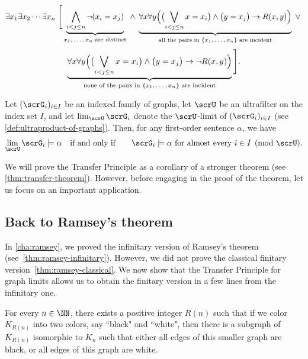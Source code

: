 \begin{examples}
\begin{enumerate}
    \[
      \exists x_1 \exists x_2 \cdots \exists x_n \;
      \Bigg[
        \underbrace{
          \bigwedge_{i < j \le n} \neg(x_i = x_j)
        }_{\text{$x_1,\dots, x_n$ are distinct}}
        \;\wedge\;
        \underbrace{
          \forall x \forall y \Bigl(
          \bigl( \bigvee_{i < j \le n} x = x_i \bigr)
          \wedge
          \bigl( y = x_j \bigr)
          \rightarrow R(x, y)
          \Bigr)
        }_{\text{all the pairs in $\{x_1,\dots, x_n\}$ are incident}}
        \;\vee\;
        \]
        \[
        \underbrace{
          \forall x \forall y \Bigl(
          \bigl( \bigvee_{i < j \le n} x = x_i \bigr)
          \wedge
          \bigl( y = x_j \bigr)
          \rightarrow \neg R(x, y)
          \Bigr)
        }_{\text{none of the pairs in $\{x_1,\dots, x_n\}$ are incident}}
        \Bigg].
    \]
  \end{enumerate}
\end{examples}

\begin{theorem}
  Let $(\scrG_i)_{i\in I}$ be an indexed family of graphs, let  $\scrU$ be an ultrafilter on the index set $I$, and let $\lim_{\scrU} \scrG_i$ denote the $\scrU$-limit of  $(\scrG_i)_{i\in I}$ (see \cref{def:ultraproduct-of-graphs}).
  Then, for any first-order sentence $\alpha$, we have
  \[
    \lim_{\scrU} \scrG_i \models \alpha
    \quad\text{if and only if}\qquad
    \text{$\scrG_i\models \alpha$ for almost every $i\in I \pmod{\scrU}$.}
  \]
\end{theorem}

We will prove the Transfer Principle as a corollary of a stronger theorem (see \cref{thm:transfer-theorem}).
However, before engaging in the proof of the theorem, let us focus on an important application.

\subsection{Back to Ramsey’s theorem}
In \cref{cha:ramsey}, we proved the infinitary version of Ramsey’s theorem (see~\ref{thm:ramsey-infinitary}).
However, we did not prove the classical finitary version~\ref{thm:ramsey-classical}.
We now show that the Transfer Principle for graph limits allows us to obtain the finitary version in a few lines from the infinitary one.

\begin{theorem}
  For every $n \in \NN$, there exists a positive integer
  $R(n)$ such that if we color $K_{R(n)}$ into two colors, say “black" and “white",  then there is a subgraph of $K_{R(n)}$ isomorphic to $K_n$ such that either all edges of this smaller graph are black, or all edges of this graph are white.
\end{theorem}

